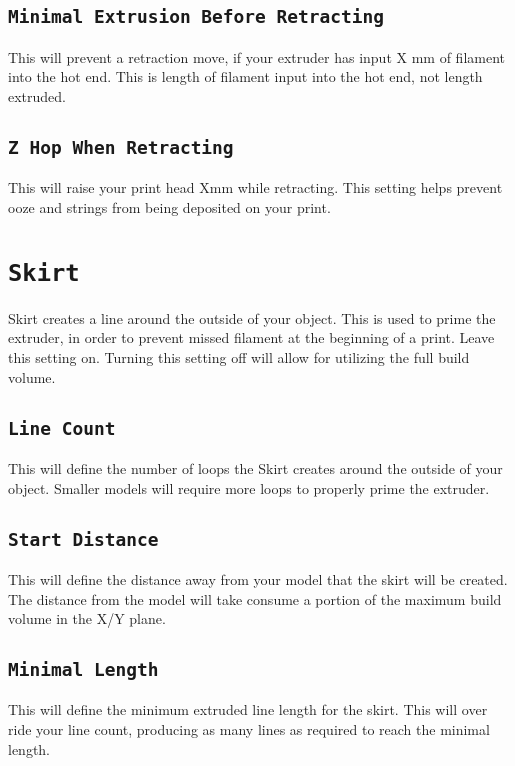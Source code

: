 \subsection{\texttt{Minimal Extrusion Before Retracting}}
This will prevent a retraction move, if your extruder has input X mm of filament into the hot end. This is length of filament input into the hot end, not length extruded.

\subsection{\texttt{Z Hop When Retracting}}
This will raise your print head Xmm while retracting. This setting helps prevent ooze and strings from being deposited on your print. 

\section{\texttt{Skirt}}
Skirt creates a line around the outside of your object. This is used to prime the extruder, in order to prevent missed filament at the beginning of a print. Leave this setting on. Turning this setting off will allow for utilizing the full build volume.

\subsection{\texttt{Line Count}}
This will define the number of loops the Skirt creates around the outside of your object. Smaller models will require more loops to properly prime the extruder.

\subsection{\texttt{Start Distance}}
This will define the distance away from your model that the skirt will be created. The distance from the model will take consume a portion of the maximum build volume in the X/Y plane.

\subsection{\texttt{Minimal Length}}
This will define the minimum extruded line length for the skirt. This will over ride your line count, producing as many lines as required to reach the minimal length.

